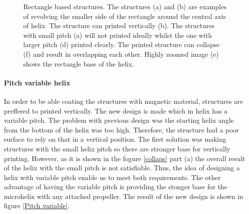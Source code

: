 \documentclass[12pt,a4paper,titlepage]{report}
\begin{document}
\begin{figure}
        \caption[Rectangle based structures]{Rectangle based structures. The structures (a) and (b) are examples of
revolving the smaller side of the rectangle around the central axis of helix. The structure 
can printed vertically (b). The structures with small pitch (a) will not printed ideally whilst
the one with larger pitch (d) printed clearly. The printed structure can collapse (f)
and result in overlapping each other. Highly zoomed image (e) shows the rectangle base of the
helix.}\label{Rectangle based structures}

       

\end{figure}



\paragraph{Pitch variable helix}

In order to be able coating the structures with magnetic material, structures are preffered to printed vertically. 
The new design is made which in helix has a variable pitch. The problem with previous design was the starting helix
angle from the bottom of the helix was too high. Therefore, the structure had a poor surface to rely on that in a vertical
position. The first solution was making structures with the small helix pitch so there are stronger base for vertically
printing. However, as it is shown in the fogure \ref{collaps} part (a) the overall result of the helix with the small pitch
is not satisfiable. Thus, the idea of designing a helix with variable pitch enable us to meet both requirements. The
other advantage of having the variable pitch is providing the stonger base for the microhelix with any attached 
propeller. The result of the new design is shown in figure \ref{Pitch variable}.
\end{document}
